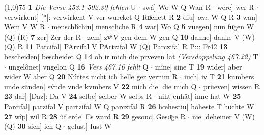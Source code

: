 \documentclass[8pt,a4paper,notitlepage]{article}
\begin{document}
\begin{table}[ht]
\begin{minipage}[t]{0.5\linewidth}
\line(1,0){75} \newline
\textbf{1} \textit{Die Verse 453.1-502.30 fehlen} U   $\cdot$ swâ] Wo W Q Wan R  $\cdot$ werc] wer R  $\cdot$ verwirkent] [*]: verwirkent V ver wurcket Q Ruͯchett R \textbf{2} diu] \textit{om.} W Q R \textbf{3} wan] Wem V W R  $\cdot$ menschlîchiu] menscliche R \textbf{4} war] Wo Q \textbf{5} vüegen] nun fuͤgen W (Q) (R) \textbf{7} zer] Zer der R  $\cdot$ zem] zvͦ V gen dem W gen Q \textbf{10} danne] danke V (W) (Q) R \textbf{11} Parcifal] PArzifal V PArtzifal W (Q) Parczifal R P::: Fr42 \textbf{13} bescheiden] bescheidet Q \textbf{14} ob ir mich die prveven lat \textit{(Versdoppelung 467.22)} T  $\cdot$ ungelônet] vngelon Q \textbf{16} \textit{Vers 467.16 fehlt} Q   $\cdot$ mîne] sine T \textbf{19} wider] aber wider W aber Q \textbf{20} Núttes nicht ich helle ger vernim R  $\cdot$ iuch] iv T \textbf{21} kumbers unde sünden] sv́nde vnde kvmbers V \textbf{22} mich die] die mich Q  $\cdot$ prüeven] wissen R \textbf{23} dar] [Daz]: Da V \textbf{24} selbe] selber W selbs R  $\cdot$ niht enhât] inne hat W \textbf{25} Parcifal] parzifal V partzifal W Q parczifal R \textbf{26} hœhestiu] hoheste T hoͤchte W \textbf{27} wîp] wil R \textbf{28} ûf erde] Es ward R \textbf{29} gesouc] Gesoͯge R  $\cdot$ nie] deheiner V (W) (Q) \textbf{30} sich] ich Q  $\cdot$ gelust] lust W \newline
\end{minipage}
\end{table}
\end{document}
